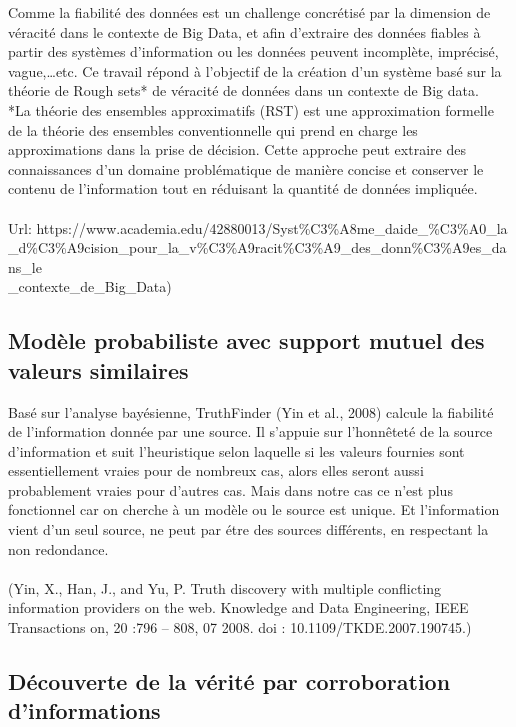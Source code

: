 \documentclass[12pt]{report}
\begin{document}
Comme la fiabilité des données est un challenge concrétisé par la
dimension de véracité dans le contexte de Big Data, et afin d’extraire des
données fiables à partir des systèmes d’information ou les données peuvent
incomplète, imprécisé, vague,…etc. Ce travail répond à l’objectif de la
création d’un système basé sur la théorie de Rough sets* de véracité de
données dans un contexte de Big data.
\\
*La théorie des ensembles approximatifs (RST) est une approximation
formelle de la théorie des ensembles conventionnelle qui prend en charge
les approximations dans la prise de décision. Cette approche peut extraire
des connaissances d'un domaine problématique de manière concise et
conserver le contenu de l'information tout en réduisant la quantité de
données impliquée.\\ \\
Url: https://www.academia.edu/42880013/Syst\%C3\%A8me\_daide\_\%C3\%A0\_la\\\_d\%C3\%A9cision\_pour\_la\_v\%C3\%A9racit\%C3\%A9\_des\_donn\%C3\%A9es\_dans\_le\\\_contexte\_de\_Big\_Data)


\subsection{Modèle probabiliste avec support mutuel des valeurs similaires}

Basé sur l’analyse bayésienne, TruthFinder (Yin et al., 2008) calcule la
fiabilité de l’information donnée par une source. Il s’appuie sur l’honnêteté
de la source d’information et suit l’heuristique selon laquelle si les valeurs
fournies sont essentiellement vraies pour de nombreux cas, alors elles
seront aussi probablement vraies pour d’autres cas. Mais dans notre cas ce n’est plus fonctionnel car on cherche à un modèle ou le source est unique.
Et l’information vient d’un seul source, ne peut par étre des sources
différents, en respectant la non redondance.
\\ \\(Yin, X., Han, J., and Yu, P. Truth discovery with multiple conflicting
information providers on the web. Knowledge and Data Engineering,
IEEE Transactions on, 20 :796 – 808, 07 2008. doi :
10.1109/TKDE.2007.190745.)

\subsection{Découverte de la vérité par corroboration d’informations}
\end{document}
